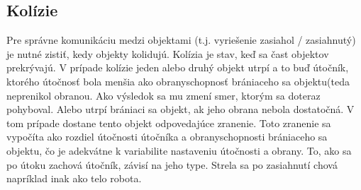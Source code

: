 \subsection{Kolízie}\label{kolizie}
Pre správne komunikáciu medzi objektami (t.j. vyriešenie zasiahol / zasiahnutý) je nutné zistiť, kedy objekty kolidujú. Kolízia je stav, keď sa čast objektov prekrývajú. V prípade kolízie jeden alebo druhý objekt utrpí a to buď útočník, ktorého útočnosť bola menšia ako obranyschopnosť brániaceho sa objektu(teda neprenikol obranou. Ako výsledok sa mu zmení smer, ktorým sa doteraz pohyboval. Alebo utrpí brániaci sa objekt, ak jeho obrana nebola dostatočná. V tom prípade dostane tento objekt odpovedajúce zranenie. Toto zranenie sa vypočíta ako rozdiel útočnosti útočníka a obranyschopnosti brániaceho sa objektu, čo je adekvátne k variabilite nastaveniu útočnosti a obrany. To, ako sa po útoku zachová útočník, závisí na jeho type. Strela sa po zasiahnutí chová napríklad inak ako telo robota.
